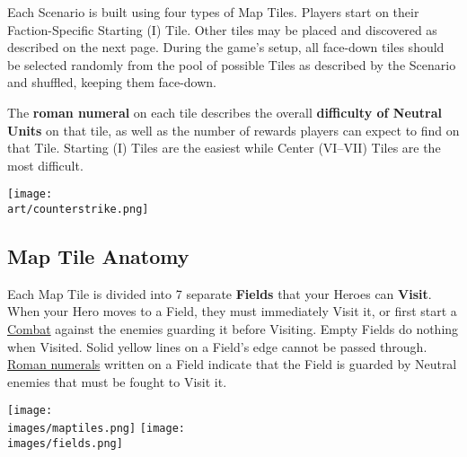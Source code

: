 
\begin{multicols*}{2}
Each Scenario is built using four types of Map Tiles.
Players start on their Faction-Specific Starting (I) Tile.
Other tiles may be placed and discovered as described on the next page.
During the game's setup, all face-down tiles should be selected randomly from the pool of possible Tiles as described by the Scenario and shuffled, keeping them face-down.\par
The \textbf{roman numeral} on each tile describes the overall \textbf{difficulty of Neutral Units} on that tile, as well as the number of rewards players can expect to find on that Tile.
Starting (I) Tiles are the easiest while Center (VI–VII) Tiles are the most difficult.\par

\vfill
\begin{center}
  \texttt{[image: \\art/counterstrike.png]}
\end{center}
\vfill

\subsection*{Map Tile Anatomy}
Each Map Tile is divided into 7 separate \textbf{Fields} that your Heroes can \textbf{Visit}.
When your Hero moves to a Field, they must immediately Visit it, or
first start a \hyperlink{Combat}{Combat} against the enemies guarding it before Visiting.
Empty Fields do nothing when Visited.
Solid yellow lines on a Field's edge cannot be passed through.
\hyperlink{Difficulty}{Roman numerals} written on a Field indicate that the Field is guarded by Neutral enemies that must be fought to Visit it.\par
\columnbreak
\texttt{[image: \\images/maptiles.png]}
\vfill
\texttt{[image: \\images/fields.png]}
\end{multicols*}

\clearpage

